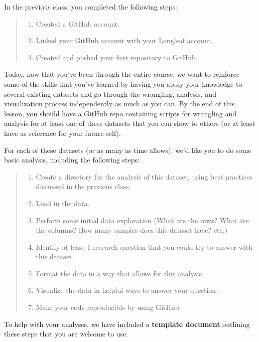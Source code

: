 \documentclass[
  letterpaper,
  DIV=11,
  numbers=noendperiod]{scrreprt}
\begin{document}
In the previous class, you completed the following steps:

\begin{quote}
\begin{enumerate}
\def\labelenumi{\arabic{enumi}.}
\item
  Created a GitHub account.
\item
  Linked your GitHub account with your Longleaf account.
\item
  Created and pushed your first repository to GitHub.
\end{enumerate}
\end{quote}

Today, now that you've been through the entire course, we want to
reinforce some of the skills that you've learned by having you apply
your knowledge to several existing datasets and go through the
wrangling, analysis, and visualization process independently as much as
you can. By the end of this lesson, you should have a GitHub repo
containing scripts for wrangling and analysis for at least one of these
datasets that you can show to others (or at least have as reference for
your future self).

For each of these datasets (or as many as time allows), we'd like you to
do some basic analysis, including the following steps:

\begin{quote}
\begin{enumerate}
\def\labelenumi{\arabic{enumi}.}
\item
  Create a directory for the analysis of this dataset, using best
  practices discussed in the previous class.
\item
  Load in the data.
\item
  Perform some initial data exploration (What are the rows? What are the
  columns? How many samples does this dataset have? etc.)
\item
  Identify at least 1 research question that you could try to answer
  with this dataset.
\item
  Format the data in a way that allows for this analysis.
\item
  Visualize the data in helpful ways to answer your question.
\item
  Make your code reproducible by using GitHub.
\end{enumerate}
\end{quote}

To help with your analyses, we have included a \textbf{template
document} outlining these steps that you are welcome to use.
\end{document}
